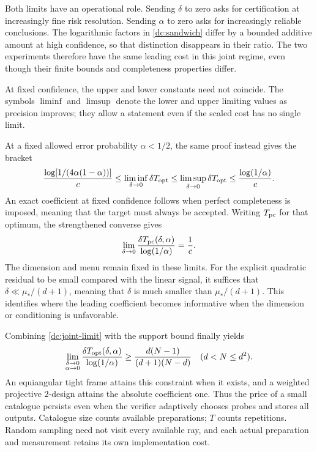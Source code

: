 \documentclass[11pt,a4paper]{article}
\numberwithin{equation}{section}
\begin{document}
Both limits have an operational role.  Sending $\delta$ to zero asks for
certification at increasingly fine risk resolution.  Sending $\alpha$ to
zero asks for increasingly reliable conclusions.  The logarithmic factors
in \eqref{dc:sandwich} differ by a bounded additive amount at high
confidence, so that distinction disappears in their ratio.  The two
experiments therefore have the same leading cost in this joint regime,
even though their finite bounds and completeness properties differ.

At fixed confidence, the upper and lower constants need not coincide.
The symbols $\liminf$ and $\limsup$ denote the lower and upper limiting
values as precision improves; they allow a statement even if the scaled
cost has no single limit.

At a fixed allowed error probability $\alpha<1/2$, the same proof instead gives the bracket
\[
 \frac{\log[1/(4\alpha(1-\alpha))]}{c}
 \leq\liminf_{\delta\to0}\delta T_{\rm opt}
 \leq\limsup_{\delta\to0}\delta T_{\rm opt}
 \leq\frac{\log(1/\alpha)}{c}.
\]
An exact coefficient at fixed confidence follows when perfect completeness
is imposed, meaning that the target must always be accepted.  Writing
$T_{\rm pc}$ for that optimum, the strengthened converse gives
\[
 \lim_{\delta\to0}
 \frac{\delta T_{\rm pc}(\delta,\alpha)}{\log(1/\alpha)}=\frac1c.
\]
The dimension and menu remain fixed in these limits.  For the explicit
quadratic residual to be small compared with the linear signal, it suffices that $\delta\ll\mu_* /(d+1)$, meaning that $\delta$ is much smaller than $\mu_* /(d+1)$.  This identifies where the leading coefficient
becomes informative when the dimension or conditioning is unfavorable.

Combining \eqref{dc:joint-limit} with the support bound finally yields
\[
 \lim_{\substack{\delta\to0\\\alpha\to0}}
 \frac{\delta T_{\rm opt}(\delta,\alpha)}{\log(1/\alpha)}
 \geq\frac{d(N-1)}{(d+1)(N-d)}
 \quad(d<N\leq d^2).
\]
An equiangular tight frame attains this constraint when it exists, and a
weighted projective $2$-design attains the absolute coefficient one.  Thus
the price of a small catalogue persists even when the verifier adaptively
chooses probes and stores all outputs.  Catalogue size counts available
preparations; $T$ counts repetitions.  Random sampling need not visit every
available ray, and each actual preparation and measurement retains its own
implementation cost.
\end{document}
